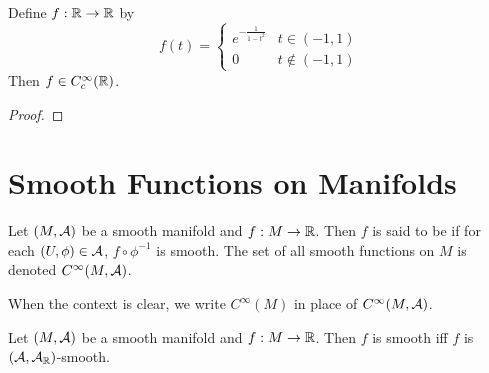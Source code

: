 \documentclass{book}
\begin{document}
\begin{ex}
	Define $f:\mathbb{R} \rightarrow \mathbb{R}$ by 
	\[
	f(t) = 
	\begin{cases}
		e^{-\frac{1}{1-t^2}} & t \in (-1,1)\\
		0 &  t \not \in (-1,1)
	\end{cases}
	\]
	Then $f \in C_c^{\infty}(\mathbb{R})$.
\end{ex}

\begin{proof}
	
\end{proof}




































\newpage
\section{Smooth Functions on Manifolds}	

\begin{defn}  
	Let $(M, \mathcal{A})$ be a smooth manifold and $f: M \rightarrow \mathbb{R}$. Then $f$ is said to be  if for each $(U, \phi) \in \mathcal{A}$, $f \circ \phi^{-1}$ is smooth. The set of all smooth functions on $M$ is denoted $C^{\infty}(M, \mathcal{A})$.
\end{defn}

\begin{note}
	When the context is clear, we write $C^{\infty}(M)$ in place of $C^{\infty}(M, \mathcal{A})$.
\end{note}

\begin{ex}  
	Let $(M, \mathcal{A})$ be a smooth manifold and $f: M \rightarrow \mathbb{R}$. Then $f$ is smooth iff $f$ is $(\mathcal{A}, \mathcal{A}_{\mathbb{R}})$-smooth.
\end{ex}
\end{document}
